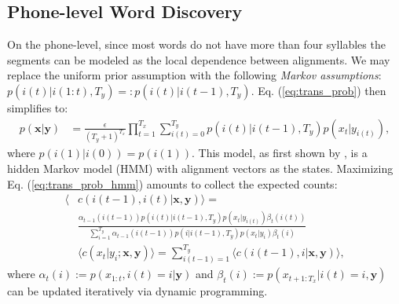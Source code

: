 \documentclass[journal]{IEEEtran}
\begin{document}

\subsection{Phone-level Word Discovery}
On the phone-level, since most words do not have more than four syllables the segments can be modeled as the local dependence between alignments. We may replace the uniform prior assumption with the following \textit{Markov assumptions}: $p(i(t)|i(1:t), T_y) =: p(i(t)|i(t-1), T_y)$. Eq. (\ref{eq:trans_prob}) then simplifies to:
\begin{align}\label{eq:trans_prob_hmm}
    p(\mathbf x|\mathbf y) &= \frac{\epsilon}{(T_y+1)^{T_x}}\prod_{t=1}^{T_x} \sum_{i(t)=0}^{T_y}p(i(t)|i(t-1), T_y) p(x_{t}|y_{i(t)}),
\end{align}
where $p(i(1)|i(0)) = p(i(1))$. This model, as first shown by \cite{Vogel1996}, is a hidden Markov model (HMM) with alignment vectors as the states. Maximizing Eq. (\ref{eq:trans_prob_hmm}) amounts to collect the expected counts:
\begin{align}\label{eq:expected_counts_dhmm}
\langle &c(i(t-1), i(t)|\mathbf x, \mathbf y)\rangle
= \nonumber\\
&\frac{\alpha_{t-1}(i(t-1))p(i(t)|i(t-1), T_y)p(x_t|y_{i(t)})\beta_{t}(i(t))}{\sum_{i=1}^{T_y}\alpha_{t-1}(i(t-1))p(i|i(t-1), T_y)p(x_t|y_{i})\beta_t(i)}\\
&\langle c(x_t|y_i; \mathbf x, \mathbf y)\rangle
= \sum_{i(t-1)=1}^{T_y}\langle c(i(t-1), i| \mathbf x, \mathbf y)\rangle,
\end{align}
where $\alpha_t(i) := p(x_{1:t}, i(t)=i|\mathbf y)$ and $\beta_t(i) := p(x_{t+1:T_x}|i(t)=i, \mathbf y)$ can be updated iteratively via dynamic programming.
\end{document}
